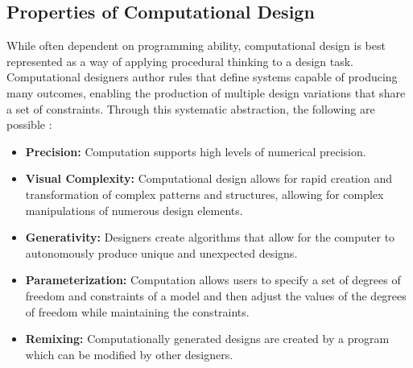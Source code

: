 \documentclass{sigchi}
\begin{document}
\subsection{Properties of Computational Design}
While often dependent on programming ability, computational design is best represented as a way of applying procedural thinking to a design task. Computational designers author rules that define systems capable of producing many outcomes, enabling the production of  multiple design variations that share a set of constraints. Through this systematic abstraction, the following are possible \cite{reas}:
\begin{itemize}
\item \textbf{Precision:} Computation supports high levels of numerical precision.
\vspace{-8pt}
\item \textbf{Visual Complexity:} Computational design allows for rapid creation and transformation of complex patterns and structures, allowing for complex manipulations of numerous design elements.
\vspace{-6pt}
\item \textbf{Generativity:} Designers create algorithms that allow for the computer to autonomously produce unique and unexpected designs.
\vspace{-6pt}
\item \textbf{Parameterization:} Computation allows users to specify a set of degrees of freedom and constraints of a model and then adjust the values of the degrees of freedom while maintaining the constraints.
\vspace{-6pt}
\item \textbf{Remixing:} Computationally generated designs are created by a program which can be modified by other designers. 
\end{itemize}	
\end{document}
